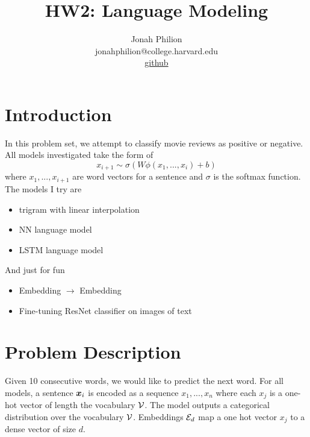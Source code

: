\documentclass[11pt]{article}
\title{HW2: Language Modeling}
\author{Jonah Philion \\ jonahphilion@college.harvard.edu \\ \href{https://github.com/jonahthelion/cs287-s18/tree/master/HW2}{github}}
\begin{document}
\maketitle{}
\section{Introduction}

In this problem set, we attempt to classify movie reviews as positive or negative. All models investigated take the form of
$$ x_{i+1} \sim \sigma(W\phi(x_1,...,x_i) + b)$$
where $x_1,...,x_{i+1}$ are word vectors for a sentence and $\sigma$ is the softmax function. The models I try are

\begin{itemize}
\item trigram with linear interpolation
\item NN language model
\item LSTM language model
\end{itemize}

And just for fun
\begin{itemize}
\item Embedding $\rightarrow$ Embedding
\item Fine-tuning ResNet classifier on images of text
\end{itemize}

%


\section{Problem Description}
Given 10 consecutive words, we would like to predict the next word.
For all models, a sentence $\boldsymbol{x}_i$ is encoded as a sequence $x_1,...,x_n$ where each $x_j$ is a one-hot vector of length the vocabulary $\mathcal{V}$. The model outputs a categorical distribution over the vocabulary $\mathcal{V}$. Embeddings $\mathcal{E}_d$ map a one hot vector $x_j$ to a dense vector of size $d$. 
\end{document}
